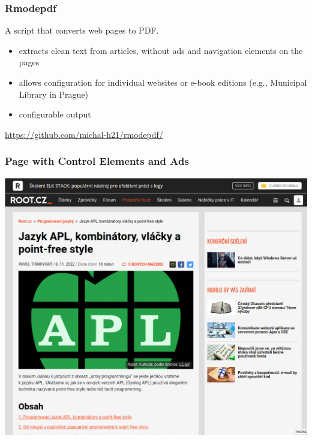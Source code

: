 \begin{frame}
  \frametitle{Rmodepdf}

  A script that converts  web pages to PDF.

  \begin{itemize}
    \item extracts clean text from articles, without ads and navigation elements on the pages
    \item allows configuration for individual websites or e-book editions (e.g., Municipal Library in Prague)
    \item configurable output 
  \end{itemize}


  \url{https://github.com/michal-h21/rmodepdf/}
\end{frame}

\begin{frame}
  \frametitle{Page with Control Elements and Ads}
  \begin{center}
    \includegraphics[height=.7\textheight]{img/root-balast.png}
  \end{center}
\end{frame}

